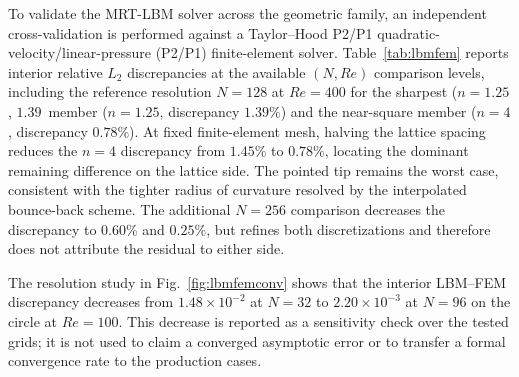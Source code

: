 \documentclass[11pt]{article}
\begin{document}
To validate the MRT-LBM solver across the geometric family, an independent cross-validation is performed against a Taylor--Hood \color{revred}P2/P1 \color{revblue}quadratic-velocity/linear-pressure (P2/P1)\color{black} finite-element solver. Table~\ref{tab:lbmfem} reports interior relative $L_2$ discrepancies at the available $(N,Re)$ comparison levels, including the reference resolution $N=128$ at $Re=400$ for the sharpest\color{revred} ($n=1.25$, $1.39\,$%
\color{revblue}member ($n=1.25$, discrepancy $1.39\%$) and the near-square member ($n=4$,
\color{black}
\color{revblue}discrepancy $0.78\%$). At fixed finite-element mesh, halving the lattice spacing
\color{black}
\color{revblue}reduces the $n=4$ discrepancy from $1.45\%$ to $0.78\%$, locating the dominant
\color{black}
\color{revblue}remaining difference on the lattice side. The pointed tip remains the worst
\color{black}
\color{revblue}case, consistent with the tighter radius of curvature resolved by the
\color{black}
\color{revblue}interpolated bounce-back scheme. The additional $N=256$ comparison decreases the
\color{black}
\color{revblue}discrepancy to $0.60\%$ and $0.25\%$, but refines both discretizations and
\color{black}
\color{revblue}therefore does not attribute the residual to either side.
\color{black}

The resolution study in Fig.~\ref{fig:lbmfemconv} shows that the interior LBM--FEM discrepancy decreases from $1.48\times10^{-2}$ at $N=32$ to $2.20\times10^{-3}$ at $N=96$ on the circle at $Re=100$. This decrease is reported as a sensitivity check over the tested grids; it is not used to claim a converged asymptotic error or to transfer a formal convergence rate to the production cases.
\end{document}
